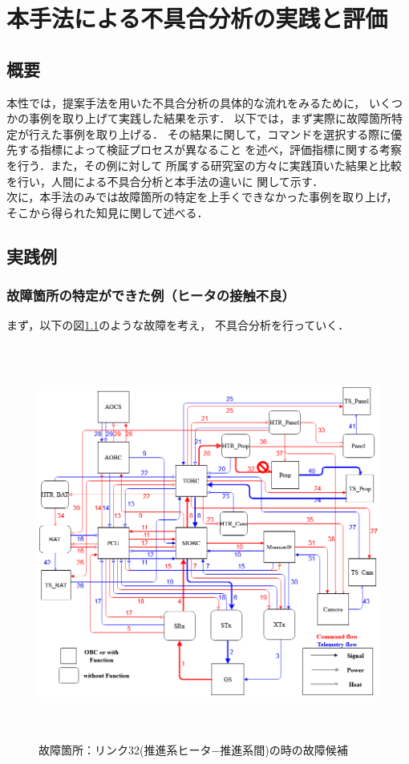 \documentclass[11pt]{jsreport}
\begin{document}
\fi

\chapter{本手法による不具合分析の実践と評価}

\section{概要}
本性では，提案手法を用いた不具合分析の具体的な流れをみるために，
いくつかの事例を取り上げて実践した結果を示す．
以下では，まず実際に故障箇所特定が行えた事例を取り上げる．
その結果に関して，コマンドを選択する際に優先する指標によって検証プロセスが異なること
を述べ，評価指標に関する考察を行う．また，その例に対して
所属する研究室の方々に実践頂いた結果と比較を行い，人間による不具合分析と本手法の違いに
関して示す．\\
次に，本手法のみでは故障箇所の特定を上手くできなかった事例を取り上げ，
そこから得られた知見に関して述べる．\\


\newpage
\section{実践例}
\subsection{故障箇所の特定ができた例（ヒータの接触不良）}
まず，以下の図\ref{fig:fault_mode1}のような故障を考え，
不具合分析を行っていく．\\
\begin{figure}[H]
   \centering
      \includegraphics[height=13.0cm]{figure/fault_mode1.png}
      \caption{故障箇所：リンク32(推進系ヒータ−推進系間)の時の故障候補}
      \label{fig:fault_mode1}
\end{figure}
\end{document}
